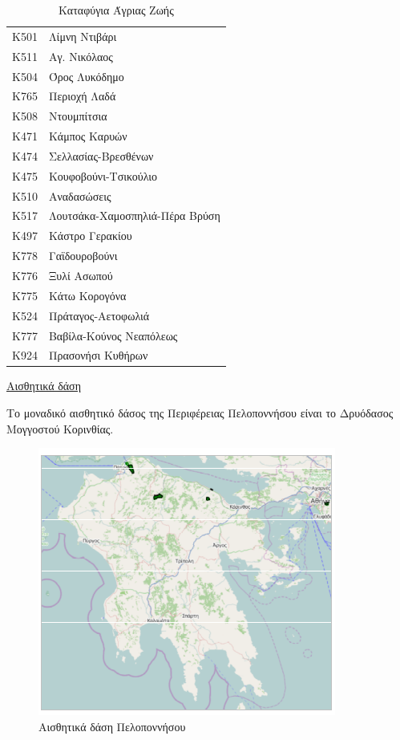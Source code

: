 \documentclass[12pt]{article}
\begin{document}
\begin{table}[H]
\begin{tabular}{ll}
			Κ501					& Λίμνη Ντιβάρι \\
			Κ511					& Αγ. Νικόλαος \\
			Κ504					& Όρος Λυκόδημο \\
			Κ765					& Περιοχή Λαδά \\
			Κ508					& Ντουμπίτσια \\
			Κ471					& Κάμπος Καρυών \\
			Κ474					& Σελλασίας-Βρεσθένων \\
			Κ475					& Κουφοβούνι-Τσικούλιο \\
			Κ510					& Αναδασώσεις \\
			Κ517					& Λουτσάκα-Χαμοσπηλιά-Πέρα Βρύση \\
			Κ497					& Κάστρο Γερακίου \\
			Κ778					& Γαϊδουροβούνι \\
			Κ776					& Ξυλί Ασωπού \\
			Κ775					& Κάτω Κορογόνα \\
			Κ524					& Πράταγος-Αετοφωλιά \\
			Κ777					& Βαβίλα-Κούνος Νεαπόλεως \\
			Κ924					& Πρασονήσι Κυθήρων \\
			\hline                      
		\end{tabular}
		\caption{Καταφύγια Άγριας Ζωής}
	\end{table}

	\underline{Αισθητικά δάση}
	
	Το μοναδικό αισθητικό δάσος της Περιφέρειας Πελοποννήσου είναι το Δρυόδασος Μογγοστού Κορινθίας.
	
	\begin{figure} [H]
		\begin{center}
			\includegraphics [scale = 0.90] {aisthitika.png}
			\caption{Αισθητικά δάση Πελοποννήσου}
		\end{center}
	\end{figure}
	
\end{document}
